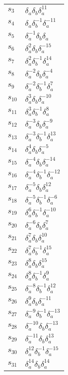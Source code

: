 \documentclass{article}
\begin{document}
\begin{center}
\begin{tabular}{ll}
$s_{3}$ & $\delta_a^{}\delta_b^{}\delta_a^{11}$ \\
$s_{4}$ & $\delta_a^{}\delta_b^{-1}\delta_a^{-11}$ \\
$s_{5}$ & $\delta_a^{-1}\delta_b^{}\delta_a^{}$ \\
$s_{6}$ & $\delta_a^{2}\delta_b^{}\delta_a^{-15}$ \\
$s_{7}$ & $\delta_a^{2}\delta_b^{-1}\delta_a^{14}$ \\
$s_{8}$ & $\delta_a^{-2}\delta_b^{}\delta_a^{-4}$ \\
$s_{9}$ & $\delta_a^{-2}\delta_b^{-1}\delta_a^{7}$ \\
$s_{10}$ & $\delta_a^{3}\delta_b^{}\delta_a^{-10}$ \\
$s_{11}$ & $\delta_a^{3}\delta_b^{-1}\delta_a^{8}$ \\
$s_{12}$ & $\delta_a^{-3}\delta_b^{}\delta_a^{-9}$ \\
$s_{13}$ & $\delta_a^{-3}\delta_b^{-1}\delta_a^{13}$ \\
$s_{14}$ & $\delta_a^{4}\delta_b^{}\delta_a^{-5}$ \\
$s_{15}$ & $\delta_a^{-4}\delta_b^{}\delta_a^{-14}$ \\
$s_{16}$ & $\delta_a^{-4}\delta_b^{-1}\delta_a^{-12}$ \\
$s_{17}$ & $\delta_a^{-5}\delta_b^{}\delta_a^{12}$ \\
$s_{18}$ & $\delta_a^{-5}\delta_b^{-1}\delta_a^{-6}$ \\
$s_{19}$ & $\delta_a^{6}\delta_b^{-1}\delta_a^{-10}$ \\
$s_{20}$ & $\delta_a^{-6}\delta_b^{}\delta_a^{7}$ \\
$s_{21}$ & $\delta_a^{7}\delta_b^{}\delta_a^{10}$ \\
$s_{22}$ & $\delta_a^{7}\delta_b^{-1}\delta_a^{15}$ \\
$s_{23}$ & $\delta_a^{8}\delta_b^{}\delta_a^{15}$ \\
$s_{24}$ & $\delta_a^{8}\delta_b^{-1}\delta_a^{9}$ \\
$s_{25}$ & $\delta_a^{-8}\delta_b^{-1}\delta_a^{12}$ \\
$s_{26}$ & $\delta_a^{9}\delta_b^{}\delta_a^{-11}$ \\
$s_{27}$ & $\delta_a^{-9}\delta_b^{-1}\delta_a^{-13}$ \\
$s_{28}$ & $\delta_a^{-10}\delta_b^{}\delta_a^{-13}$ \\
$s_{29}$ & $\delta_a^{-11}\delta_b^{}\delta_a^{13}$ \\
$s_{30}$ & $\delta_a^{12}\delta_b^{-1}\delta_a^{-15}$ \\
$s_{31}$ & $\delta_a^{14}\delta_b^{}\delta_a^{14}$ \\
\bottomrule
\end{tabular}
\end{center}

\thispagestyle{empty}
\end{document}
